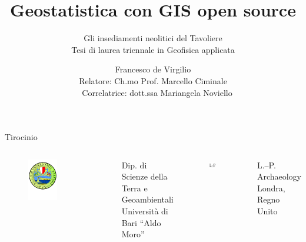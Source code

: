 \documentclass[xcolor=svgnames]{beamer}
\title[Geostatistica con GIS open source]{Geostatistica con GIS open source}
\subtitle{Gli insediamenti neolitici del Tavoliere\\{\tiny Tesi di laurea triennale in Geofisica applicata}}
\author[Francesco \mbox{de Virgilio}]{
    Francesco de Virgilio\\\vspace{0.05\textwidth}
    {\scriptsize
        Relatore: Ch.mo Prof. Marcello Ciminale\\
        ~~Correlatrice: dott.ssa Mariangela Noviello
    }
}
\date{}
\begin{document}
    {\aauwavesbg%
        \begin{frame}
            \titlepage
        \end{frame}
    }

    \begin{frame}{Tirocinio}
        \begin{columns}[c]
            \centering
            \begin{figure}
                \centering
                \includegraphics[width=0.5\textwidth]{AAUgraphics/uniba}
            \end{figure}
            \vspace{-0.2\textwidth}
            Dip. di Scienze della Terra e Geoambientali\\
            Università di Bari ``Aldo Moro''
            \centering
            \begin{figure}
                \centering
                \includegraphics[width=0.5\textwidth]{img/logo}
            \end{figure}
            \vspace{-0.1\textwidth}
            L.--P. Archaeology\\
            Londra, Regno Unito
        \end{columns}
    \end{frame}
\end{document}
